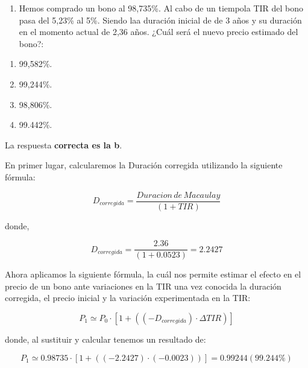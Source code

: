 \documentclass[
  letterpaper,
  DIV=11,
  numbers=noendperiod]{scrreprt}
\providecommand{\tightlist}{%
  \setlength{\itemsep}{0pt}\setlength{\parskip}{0pt}}\usepackage{longtable,booktabs,array}
\begin{document}
\begin{enumerate}
\def\labelenumi{\arabic{enumi}.}
\setcounter{enumi}{59}
\tightlist
\item
  Hemos comprado un bono al 98,735\%. Al cabo de un tiempola TIR del
  bono pasa del 5,23\% al 5\%. Siendo laa duración inicial de de 3 años
  y su duración en el momento actual de 2,36 años. ¿Cuál será el nuevo
  precio estimado del bono?:
\end{enumerate}

\begin{enumerate}
\def\labelenumi{\alph{enumi}.}
\item
  99,582\%.
\item
  99,244\%.
\item
  98,806\%.
\item
  99.442\%.
\end{enumerate}

\begin{tcolorbox}[enhanced jigsaw, left=2mm, opacityback=0, colback=white, breakable, arc=.35mm, bottomrule=.15mm, rightrule=.15mm, toprule=.15mm, leftrule=.75mm, colframe=quarto-callout-tip-color-frame]
\begin{minipage}[t]{5.5mm}
\textcolor{quarto-callout-tip-color}{\faLightbulb}
\end{minipage}%
\begin{minipage}[t]{\textwidth - 5.5mm}

La respuesta \textbf{correcta es la b}.

En primer lugar, calcularemos la Duración corregida utilizando la
siguiente fórmula:

\[D_{corregida}=\frac{Duracion\,de\, Macaulay}{\left(1+TIR\right)}\]

donde,

\[D_{corregida}=\frac{2.36}{(1+0.0523)}=2.2427\]

Ahora aplicamos la siguiente fórmula, la cuál nos permite estimar el
efecto en el precio de un bono ante variaciones en la TIR una vez
conocida la duración corregida, el precio inicial y la variación
experimentada en la TIR:

\[P_1\simeq P_0\cdot\left[1+((-D_{corregida})\cdot\Delta TIR)\right]\]

donde, al sustituir y calcular tenemos un resultado de:

\[P_1\simeq 0.98735\cdot\left[1+((-2.2427)\cdot (-0.0023))\right]=0.99244(99.244\%)\]

\end{minipage}%
\end{tcolorbox}
\end{document}
